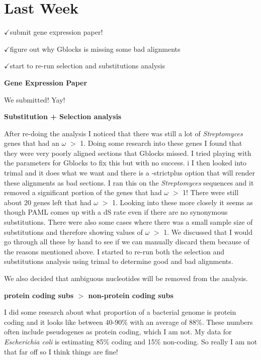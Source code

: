 \documentclass[12pt]{article}
\newcommand{\strep}{\textit{Streptomyces}\xspace}
\newcommand{\ecoli}{\textit{Escherichia coli}\xspace}
\newcommand{\ch}{$\checkmark$}
\begin{document}

	
\section*{Last Week}

\ch submit gene expression paper!

\ch figure out why Gblocks is missing some bad alignments

\ch start to re-run selection and substitutions analysis

\textbf{Gene Expression Paper}

We submitted! Yay! 


\textbf{Substitution + Selection analysis}

After re-doing the analysis I noticed that there was still a lot of \strep genes that had an $\omega$ $>$ 1.
Doing some research into these genes I found that they were very poorly aligned sections that Gblocks missed.
I tried playing with the parameters for Gblocks to fix this but with no success. i
I then looked into trimal and it does what we want and there is a -strictplus option that will render these alignments as bad sections.
I ran this on the \strep sequences and it removed a significant portion of the genes that had $\omega$ $>$ 1!
There were still about 20 genes left that had $\omega$ $>$ 1.
Looking into these more closely it seems as though PAML comes up with a dS rate even if there are no synonymous substitutions.
There were also some cases where there was a small sample size of substitutions and therefore showing values of $\omega$ $>$ 1.
We discussed that I would go through all these by hand to see if we can manually discard them because of the reasons mentioned above.
I started to re-run both the selection and substitutions analysis using trimal to determine good and bad alignments.

We also decided that ambiguous nucleotides will be removed from the analysis.

\textbf{protein coding subs $>$ non-protein coding subs}

I did some research about what proportion of a bacterial genome is protein coding and it looks like between 40-90\% with an average of 88\%. These numbers often include pseudogenes as protein coding, which I am not.
My data for \ecoli is estimating 85\% coding and 15\% non-coding. So really I am not that far off so I think things are fine!
\end{document}
